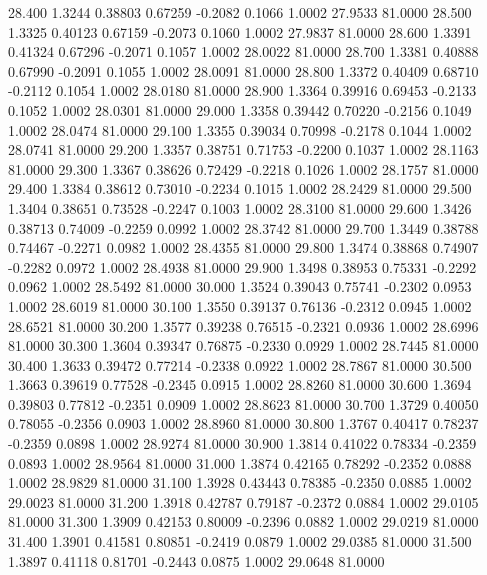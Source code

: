   28.400   1.3244   0.38803   0.67259  -0.2082   0.1066   1.0002  27.9533  81.0000
  28.500   1.3325   0.40123   0.67159  -0.2073   0.1060   1.0002  27.9837  81.0000
  28.600   1.3391   0.41324   0.67296  -0.2071   0.1057   1.0002  28.0022  81.0000
  28.700   1.3381   0.40888   0.67990  -0.2091   0.1055   1.0002  28.0091  81.0000
  28.800   1.3372   0.40409   0.68710  -0.2112   0.1054   1.0002  28.0180  81.0000
  28.900   1.3364   0.39916   0.69453  -0.2133   0.1052   1.0002  28.0301  81.0000
  29.000   1.3358   0.39442   0.70220  -0.2156   0.1049   1.0002  28.0474  81.0000
  29.100   1.3355   0.39034   0.70998  -0.2178   0.1044   1.0002  28.0741  81.0000
  29.200   1.3357   0.38751   0.71753  -0.2200   0.1037   1.0002  28.1163  81.0000
  29.300   1.3367   0.38626   0.72429  -0.2218   0.1026   1.0002  28.1757  81.0000
  29.400   1.3384   0.38612   0.73010  -0.2234   0.1015   1.0002  28.2429  81.0000
  29.500   1.3404   0.38651   0.73528  -0.2247   0.1003   1.0002  28.3100  81.0000
  29.600   1.3426   0.38713   0.74009  -0.2259   0.0992   1.0002  28.3742  81.0000
  29.700   1.3449   0.38788   0.74467  -0.2271   0.0982   1.0002  28.4355  81.0000
  29.800   1.3474   0.38868   0.74907  -0.2282   0.0972   1.0002  28.4938  81.0000
  29.900   1.3498   0.38953   0.75331  -0.2292   0.0962   1.0002  28.5492  81.0000
  30.000   1.3524   0.39043   0.75741  -0.2302   0.0953   1.0002  28.6019  81.0000
  30.100   1.3550   0.39137   0.76136  -0.2312   0.0945   1.0002  28.6521  81.0000
  30.200   1.3577   0.39238   0.76515  -0.2321   0.0936   1.0002  28.6996  81.0000
  30.300   1.3604   0.39347   0.76875  -0.2330   0.0929   1.0002  28.7445  81.0000
  30.400   1.3633   0.39472   0.77214  -0.2338   0.0922   1.0002  28.7867  81.0000
  30.500   1.3663   0.39619   0.77528  -0.2345   0.0915   1.0002  28.8260  81.0000
  30.600   1.3694   0.39803   0.77812  -0.2351   0.0909   1.0002  28.8623  81.0000
  30.700   1.3729   0.40050   0.78055  -0.2356   0.0903   1.0002  28.8960  81.0000
  30.800   1.3767   0.40417   0.78237  -0.2359   0.0898   1.0002  28.9274  81.0000
  30.900   1.3814   0.41022   0.78334  -0.2359   0.0893   1.0002  28.9564  81.0000
  31.000   1.3874   0.42165   0.78292  -0.2352   0.0888   1.0002  28.9829  81.0000
  31.100   1.3928   0.43443   0.78385  -0.2350   0.0885   1.0002  29.0023  81.0000
  31.200   1.3918   0.42787   0.79187  -0.2372   0.0884   1.0002  29.0105  81.0000
  31.300   1.3909   0.42153   0.80009  -0.2396   0.0882   1.0002  29.0219  81.0000
  31.400   1.3901   0.41581   0.80851  -0.2419   0.0879   1.0002  29.0385  81.0000
  31.500   1.3897   0.41118   0.81701  -0.2443   0.0875   1.0002  29.0648  81.0000
